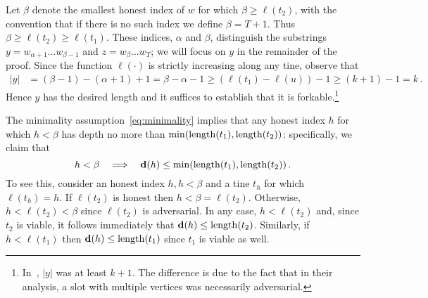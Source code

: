     Let $\beta$ denote the smallest honest index of $w$ for which 
    $\beta \geq \ell(t_2)$, with the convention that if there is no such
    index we define $\beta = T + 1$. 
    Thus $\beta \geq \ell(t_2) \geq \ell(t_1)$.
    These indices, $\alpha$ and $\beta$, distinguish the
    substrings $y = w_{\alpha+1} \ldots w_{\beta-1}$ and 
    $z = w_{\beta} \ldots w_T$; 
    we will focus on $y$ in the remainder of the proof. 
    Since the function
    $\ell(\cdot)$ is strictly increasing along any tine, observe that
    \begin{align*}
        |y| 
        &= (\beta - 1) - (\alpha + 1) + 1 
        = \beta - \alpha - 1 
        \geq (\ell(t_1) - \ell(u)) - 1 
        \geq (k + 1) - 1 
        = k
        \,.
    \end{align*}
    Hence $y$ has the desired length and it suffices to establish that it is forkable.\footnote{
      In~\citet{LinearConsistency}, $|y|$ was at least $k + 1$. 
      The difference is due to the fact that 
      in their analysis, a slot with multiple vertices 
      was necessarily adversarial. 
    }

    
    The minimality assumption~\eqref{eq:minimality} implies that any honest
    index $h$ for which $h < \beta$ has depth no more than
    $\min(\operatorname{length}(t_1),\operatorname{length}(t_2))$: specifically, we claim that 
    \begin{equation}\label{eq:honest-depth}
      h < \beta \quad\Longrightarrow \quad \mathbf{d}(h) \leq \min(\operatorname{length}(t_1), \operatorname{length}(t_2))\,.
    \end{equation}
    To see this, consider an honest index $h,h < \beta$ and a tine $t_h$
    for which $\ell(t_h) = h$. 
    If $\ell(t_2)$ is honest then $h < \beta = \ell(t_2)$. 
    Otherwise, $h < \ell(t_2) < \beta$ since $\ell(t_2)$ is adversarial. 
    In any case, $h < \ell(t_2)$ and, 
    since $t_2$ is viable, it follows immediately that
    $\mathbf{d}(h) \leq \operatorname{length}(t_2)$. 
    Similarly, if $h < \ell(t_1)$ 
    then $\mathbf{d}(h) \leq \operatorname{length}(t_1)$ since $t_1$ is viable as well. 
    

